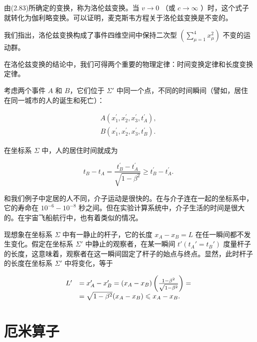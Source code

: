 由(2.83)所确定的变换，称为洛伦兹变换。当 $v \to 0$ （或 $c \to \infty$ ）时，这个式子就转化为伽利略变换。可以证明，麦克斯韦方程关于洛伦兹变换是不变的。

我们指出，洛伦兹变换构成了事件四维空间中保持二次型 $\left(\sum_{\mu=1}^{4}x_{\mu}^{2}\right)$ 不变的运动群。

在洛伦兹变换的结论中，我们可得两个重要的物理定律：时间变换定律和长度变换定律。

考虑两个事件 $A$ 和 $B$，它们位于 $\Sigma'$ 中同一个点，不同的时间瞬间（譬如，居住在同一城市的人的诞生和死亡）：

\begin{equation*}
\begin{array}{l} A \left(x _ {1} ^ {\prime}, x _ {2} ^ {\prime}, x _ {3} ^ {\prime}, t _ {A} ^ {\prime}\right), \\ B \left(x _ {1} ^ {\prime}, x _ {2} ^ {\prime}, x _ {3} ^ {\prime}, t _ {B} ^ {\prime}\right). \end{array}
\end{equation*}

在坐标系 $\Sigma$ 中，人的居住时间就成为

\begin{equation*}
t _ {B} - t _ {A} = \frac {t _ {B} ^ {\prime} - t _ {A} ^ {\prime}}{\sqrt {1 - \beta^ {2}}} \geqslant t _ {B} ^ {\prime} - t _ {A} ^ {\prime}.
\end{equation*}

和我们例子中定居的人不同，介子运动是很快的。在与介子连在一起的坐标系中，它的寿命在 $10^{-6}-10^{-8}$ 秒之间。但在实验计算系统中，介子生活的时间是很大的。在宇宙飞船航行中，也有着类似的情况。

现想象在坐标系 $\Sigma$ 中有一静止的杆子，它的长度 $x_{A} - x_{B} = L$ 在任一瞬间都不发生变化。假定在坐标系 $\Sigma'$ 中静止的观察者，在某一瞬间 $t' (t_A' = t_B')$ 度量杆子的长度，这意味着，观察者在这一瞬间固定了杆子的始点与终点。显然，此时杆子的长度在坐标系 $\Sigma'$ 中将变化，等于

\begin{equation*}
\begin{array}{r l} L ^ {\prime} & = x _ {A} ^ {\prime} - x _ {B} ^ {\prime} = (x _ {A} - x _ {B}) \left(\frac {1 - \beta^ {2}}{\sqrt {1 - \beta^ {2}}}\right) = \\ & = \sqrt {1 - \beta^ {2}} (x _ {A} - x _ {B}) \leqslant x _ {A} - x _ {B}. \end{array}
\end{equation*}

\section{厄米算子}

